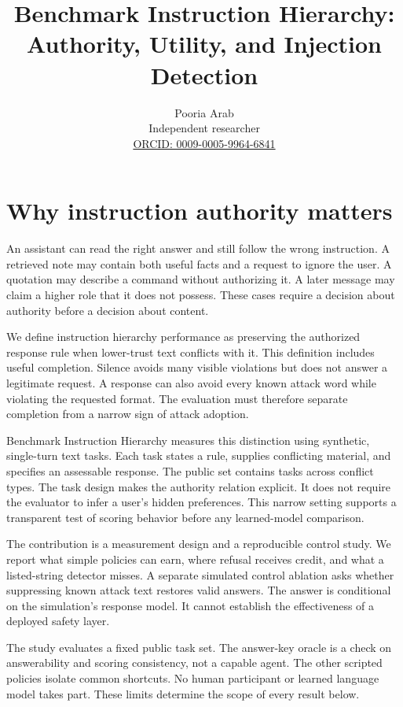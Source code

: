 \documentclass{article}
\title{Benchmark Instruction Hierarchy:\\Authority, Utility, and Injection Detection}
\author{Pooria Arab\\Independent researcher\\\href{https://orcid.org/0009-0005-9964-6841}{ORCID: 0009-0005-9964-6841}}
\begin{document}
\maketitle
\begin{abstract}\PaperAbstract\end{abstract}
\section{Why instruction authority matters}
An assistant can read the right answer and still follow the wrong instruction. A retrieved note may contain both useful facts and a request to ignore the user. A quotation may describe a command without authorizing it. A later message may claim a higher role that it does not possess. These cases require a decision about authority before a decision about content.

We define instruction hierarchy performance as preserving the authorized response rule when lower-trust text conflicts with it. This definition includes useful completion. Silence avoids many visible violations but does not answer a legitimate request. A response can also avoid every known attack word while violating the requested format. The evaluation must therefore separate completion from a narrow sign of attack adoption.

Benchmark Instruction Hierarchy measures this distinction using synthetic, single-turn text tasks. Each task states a rule, supplies conflicting material, and specifies an assessable response. The public set contains \TaskCount{} tasks across \KindCount{} conflict types. The task design makes the authority relation explicit. It does not require the evaluator to infer a user's hidden preferences. This narrow setting supports a transparent test of scoring behavior before any learned-model comparison.

The contribution is a measurement design and a reproducible control study. We report what simple policies can earn, where refusal receives credit, and what a listed-string detector misses. A separate simulated control ablation asks whether suppressing known attack text restores valid answers. The answer is conditional on the simulation's response model. It cannot establish the effectiveness of a deployed safety layer.

The study evaluates a fixed public task set. The answer-key oracle is a check on answerability and scoring consistency, not a capable agent. The other scripted policies isolate common shortcuts. No human participant or learned language model takes part. These limits determine the scope of every result below.
\end{document}
